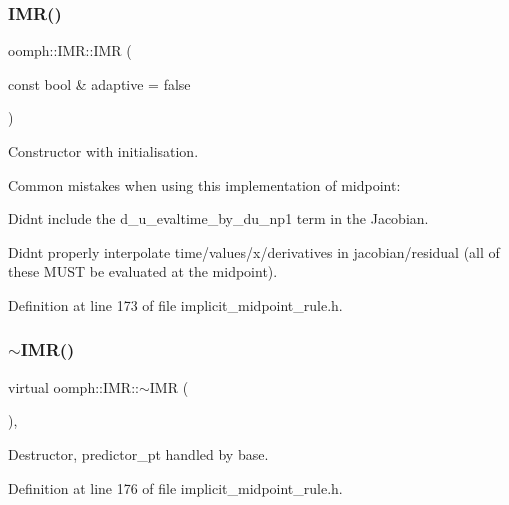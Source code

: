 \subsubsection{\texorpdfstring{I\+M\+R()}{IMR()}\hspace{0.1cm}{\footnotesize\ttfamily [1/2]}}
{\footnotesize\ttfamily oomph\+::\+I\+M\+R\+::\+I\+MR (\begin{DoxyParamCaption}\item[{const bool \&}]{adaptive = {\ttfamily false} }\end{DoxyParamCaption})\hspace{0.3cm}{\ttfamily [inline]}}



Constructor with initialisation. 

Common mistakes when using this implementation of midpoint\+:
\begin{DoxyItemize}
\item Didn\textquotesingle{}t include the d\+\_\+u\+\_\+evaltime\+\_\+by\+\_\+du\+\_\+np1 term in the Jacobian.
\item Didn\textquotesingle{}t properly interpolate time/values/x/derivatives in jacobian/residual (all of these M\+U\+ST be evaluated at the midpoint). 
\end{DoxyItemize}

Definition at line 173 of file implicit\+\_\+midpoint\+\_\+rule.\+h.

\mbox{\label{classoomph_1_1IMR_a5686334353658c65a1d5e17500f3dc34}} 
\subsubsection{\texorpdfstring{$\sim$\+I\+M\+R()}{~IMR()}}
{\footnotesize\ttfamily virtual oomph\+::\+I\+M\+R\+::$\sim$\+I\+MR (\begin{DoxyParamCaption}{ }\end{DoxyParamCaption})\hspace{0.3cm}{\ttfamily [inline]}, {\ttfamily [virtual]}}



Destructor, predictor\+\_\+pt handled by base. 



Definition at line 176 of file implicit\+\_\+midpoint\+\_\+rule.\+h.

\mbox{\label{classoomph_1_1IMR_a1c55b18131b75531e320a50aeecdf00c}} 
